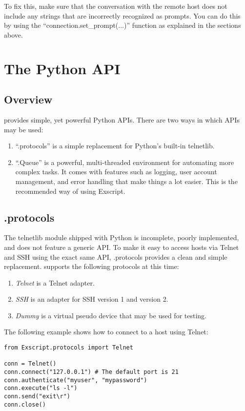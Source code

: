 To fix this, make sure that the conversation with the remote host does 
not include any strings that are incorrectly recognized as prompts. You can 
do this by using the ``connection.set\_prompt(...)'' function as explained 
in the sections above. 


\section{The Python API}
\subsection{Overview}

\product provides simple, yet powerful Python APIs. There are two ways in 
which \product APIs may be used:

\begin{enumerate}
\item ``\product.protocols'' is a simple replacement for Python's built-in 
telnetlib.
\item ``\product.Queue'' is a powerful, multi-threaded environment for 
automating more complex tasks. It comes with features such as logging, 
user account management, and error handling that make things a lot 
easier. This is the recommended way of using Exscript.
\end{enumerate}


\subsection{\product.protocols}

The telnetlib module shipped with Python is incomplete, poorly implemented, 
and does not feature a generic API. To make it easy to access hosts via 
Telnet and SSH using the exact same API, \product.protocols provides a 
clean and simple replacement.
\product supports the following protocols at this time:

\begin{enumerate}
\item {\it Telnet} is a Telnet adapter.
\item {\it SSH} is an adapter for SSH version 1 and version 2.
\item {\it Dummy} is a virtual pseudo device that may be used for testing.
\end{enumerate}

The following example shows how to connect to a host using Telnet:

\begin{lstlisting}
from Exscript.protocols import Telnet

conn = Telnet()
conn.connect("127.0.0.1") # The default port is 21
conn.authenticate("myuser", "mypassword")
conn.execute("ls -l")
conn.send("exit\r")
conn.close()
\end{lstlisting}

